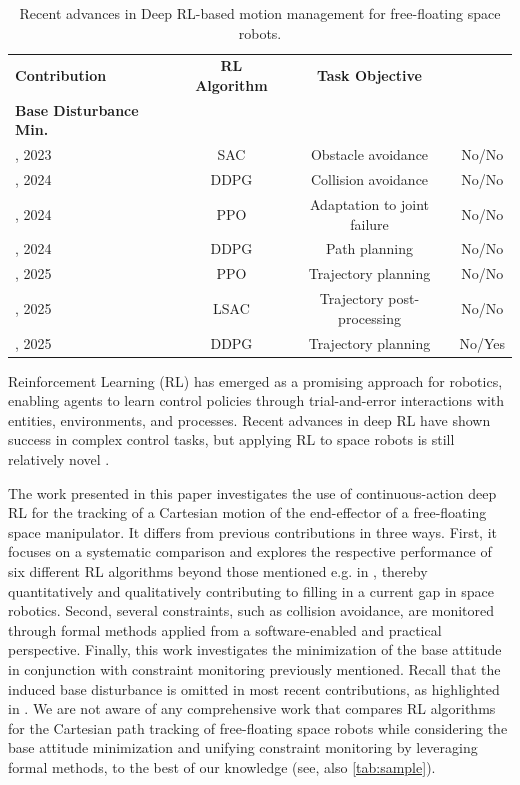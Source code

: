 \documentclass{ieeeaccess}
\begin{document}
\begin{table}[!t]
	\centering
	\caption{Recent advances in Deep RL-based motion management for free-floating space robots.}
	\label{tab:sample}
	\begin{tabular}{lccc}
		\toprule
		\textbf{Contribution} & \textbf{RL Algorithm} & \textbf{Task Objective} & \makecell{\textbf{Formal Verification/} \\ \textbf{Base Disturbance Min.}} \\
		\midrule
		\cite{huang2023obstacle}, 2023 & SAC & Obstacle avoidance & No/No \\
		\cite{al2024reinforcement}, 2024 & DDPG & Collision avoidance & No/No \\
		\cite{d2024failure}, 2024 & PPO & Adaptation to joint failure & No/No \\
		\cite{al2024path}, 2024 & DDPG & Path planning & No/No \\
		\cite{hu2025deep}, 2025 & PPO & Trajectory planning & No/No \\
		\cite{zhang2025learning}, 2025 & LSAC & Trajectory post-processing & No/No \\
		\cite{wei2025trajectory}, 2025 & DDPG & Trajectory planning & No/Yes \\
		\bottomrule
	\end{tabular}
\end{table}

Reinforcement Learning (RL) has emerged as a promising approach for robotics, enabling agents to
learn control policies through trial-and-error interactions with entities, environments, and processes. Recent advances in deep RL have shown
success in complex control tasks, but applying RL to space robots is still relatively novel \cite{wu2020reinforcement,al2024path,hu2025deep,zhang2025learning,huang2023obstacle}.  

The work presented in this paper investigates the use of continuous-action deep RL for the tracking of a Cartesian motion of the end-effector of a free-floating space
manipulator. It  differs from previous contributions in three ways. First, it focuses on a systematic comparison 
and explores the respective performance of six different RL algorithms beyond those mentioned e.g. in , thereby 
quantitatively and qualitatively contributing to filling in a current gap in space robotics. Second, several constraints, such as collision avoidance, are monitored
through formal methods applied from a software-enabled and practical perspective.  Finally, this work investigates the minimization of the 
base attitude in conjunction with constraint monitoring previously mentioned. Recall that the induced base disturbance is omitted in most recent contributions, 
as highlighted in . We are not aware of any comprehensive work that compares  RL algorithms 
for the Cartesian path tracking of free-floating space robots while considering the base attitude minimization and unifying 
constraint monitoring by leveraging formal methods, to the best of our knowledge (see, also \autoref{tab:sample}). 
\end{document}

